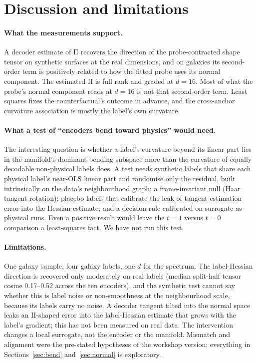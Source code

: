 \documentclass[10pt]{article}
\newcommand{\II}{\mathrm{II}}
\begin{document}
\section{Discussion and limitations}
\label{sec:discussion}

\paragraph{What the measurements support.} A decoder estimate of $\II$ recovers the direction of the probe-contracted shape tensor on synthetic surfaces at the real dimensions, and on galaxies its second-order term is positively related to how the fitted probe uses its normal component. The estimated $\II$ is full rank and graded at $d=16$. Most of what the probe's normal component reads at $d=16$ is not that second-order term. Least squares fixes the counterfactual's outcome in advance, and the cross-anchor curvature association is mostly the label's own curvature.

\paragraph{What a test of ``encoders bend toward physics'' would need.} The interesting question is whether a label's curvature beyond its linear part lies in the manifold's dominant bending subspace more than the curvature of equally decodable non-physical labels does. A test needs synthetic labels that share each physical label's near-OLS linear part and randomise only the residual, built intrinsically on the data's neighbourhood graph; a frame-invariant null (Haar tangent rotation); placebo labels that calibrate the leak of tangent-estimation error into the Hessian estimate; and a decision rule calibrated on surrogate-as-physical runs. Even a positive result would leave the $t=1$ versus $t=0$ comparison a least-squares fact. We have not run this test.

\paragraph{Limitations.} One galaxy sample, four galaxy labels, one $d$ for the spectrum. The label-Hessian direction is recovered only moderately on real labels (median split-half tensor cosine 0.17--0.52 across the ten encoders), %
and the synthetic test cannot say whether this is label noise or non-smoothness at the neighbourhood scale, because its labels carry no noise. A decoder tangent tilted into the normal space leaks an $\II$-shaped error into the label-Hessian estimate that grows with the label's gradient; this has not been measured on real data. The intervention changes a local surrogate, not the encoder or the manifold. Mismatch and alignment were the pre-stated hypotheses of the workshop version; everything in Sections~\ref{sec:bend} and~\ref{sec:normal} is exploratory.
\end{document}
